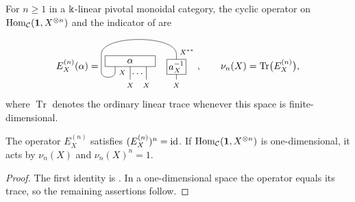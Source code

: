 \documentclass{amsart}
\begin{document}
For $n\ge 1$ in a $\Bbbk$-linear pivotal monoidal category, the cyclic operator on $\mathrm{Hom}_{\mathcal{C}}({\bf 1},X^{\otimes n})$ and the indicator
of \cite[Definition~3.1, p.~71, and Lemma~3.4, p.~72]{NgSch} are
\[
E_X^{(n)}(\alpha)=
\raisebox{-.8cm}{\begin{tikzpicture}[scale=.85]
\draw (-.6,0)--(-.6,-.5)
 arc(0:-180:.3 and .2)--(-1.2,.3)
 .. controls (-1.2,1.15) and (2.05,1.15) .. (2.05,.3)--(2.05,-.8);
\draw (.05,0)--(.05,-.8);\draw (.75,0)--(.75,-.8);
\node[font=\scriptsize] at (-.29,-.49) {$X$};
\node at (.4,-.55) {$\cdots$};
\node[draw,fill=white,minimum width=1.85cm,minimum height=.4cm] at (.05,0) {$\alpha$};
\node[draw,fill=white,inner sep=2pt] at (2.05,-.25) {$a_X^{-1}$};
\node[right] at (2.05,.4) {\scriptsize $X^{**}$};
\node[below] at (.05,-.8) {\scriptsize $X$};
\node[below] at (.75,-.8) {\scriptsize $X$};
\node[below] at (2.05,-.8) {\scriptsize $X$};
\end{tikzpicture}},
\qquad
\nu_n(X)=\operatorname{Tr}\bigl(E_X^{(n)}\bigr),
\]
where $\operatorname{Tr}$ denotes the ordinary linear trace whenever this space is
finite-dimensional.

\begin{proposition}\label{prop:nupm}
The operator $E_X^{(n)}$ satisfies $(E_X^{(n)})^n=\mathrm{id}$.
If $\mathrm{Hom}_{\mathcal{C}}({\bf 1},X^{\otimes n})$ is one-dimensional, it acts by
$\nu_n(X)$ and $\nu_n(X)^n=1$.
\end{proposition}
\begin{proof}
The first identity is \cite[Theorem~5.1, p.~75]{NgSch}. In a one-dimensional
space the operator equals its trace, so the remaining assertions follow.
\end{proof}
\end{document}
